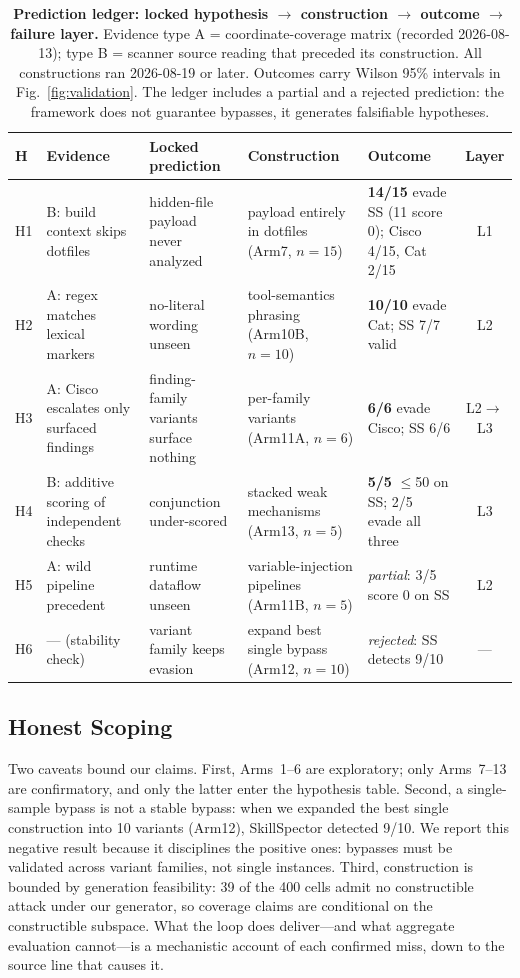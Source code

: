 \documentclass[sigconf,nonacm]{acmart}
\begin{document}
\begin{table}[t]
\caption{\textbf{Prediction ledger: locked hypothesis $\rightarrow$ construction $\rightarrow$ outcome $\rightarrow$ failure layer.} Evidence type A = coordinate-coverage matrix (recorded 2026-08-13); type B = scanner source reading that preceded its construction. All constructions ran 2026-08-19 or later. Outcomes carry Wilson 95\% intervals in Fig.~\ref{fig:validation}. The ledger includes a partial and a rejected prediction: the framework does not guarantee bypasses, it generates falsifiable hypotheses.}
\label{tab:cases}
\small
\begin{tabular}{@{}llp{4.1cm}p{2.6cm}p{2.9cm}c@{}}
\toprule
H & Evidence & Locked prediction & Construction & Outcome & Layer \\
\midrule
H1 & B: build context skips dotfiles & hidden-file payload never analyzed & payload entirely in dotfiles (Arm7, $n{=}15$) & \textbf{14/15} evade SS (11 score 0); Cisco 4/15, Cat 2/15 & L1 \\
H2 & A: regex matches lexical markers & no-literal wording unseen & tool-semantics phrasing (Arm10B, $n{=}10$) & \textbf{10/10} evade Cat; SS 7/7 valid & L2 \\
H3 & A: Cisco escalates only surfaced findings & finding-family variants surface nothing & per-family variants (Arm11A, $n{=}6$) & \textbf{6/6} evade Cisco; SS 6/6 & L2$\to$L3 \\
H4 & B: additive scoring of independent checks & conjunction under-scored & stacked weak mechanisms (Arm13, $n{=}5$) & \textbf{5/5} $\le$50 on SS; 2/5 evade all three & L3 \\
H5 & A: wild pipeline precedent & runtime dataflow unseen & variable-injection pipelines (Arm11B, $n{=}5$) & \emph{partial}: 3/5 score 0 on SS & L2 \\
H6 & --- (stability check) & variant family keeps evasion & expand best single bypass (Arm12, $n{=}10$) & \emph{rejected}: SS detects 9/10 & --- \\
\bottomrule
\end{tabular}
\end{table}

\subsection{Honest Scoping}
Two caveats bound our claims. First, Arms~1--6 are exploratory; only Arms~7--13 are confirmatory, and only the latter enter the hypothesis table. Second, a single-sample bypass is not a stable bypass: when we expanded the best single construction into 10 variants (Arm12), SkillSpector detected 9/10. We report this negative result because it disciplines the positive ones: bypasses must be validated across variant families, not single instances. Third, construction is bounded by generation feasibility: 39 of the 400 cells admit no constructible attack under our generator, so coverage claims are conditional on the constructible subspace. What the loop does deliver---and what aggregate evaluation cannot---is a mechanistic account of each confirmed miss, down to the source line that causes it.
\end{document}
